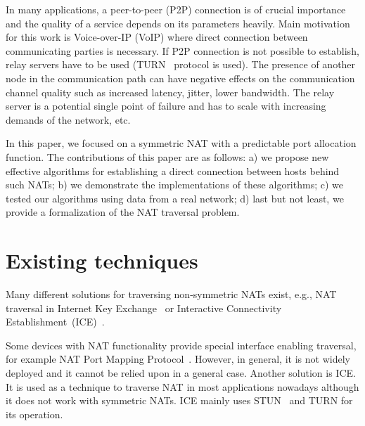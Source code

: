 \documentclass{acm_proc_article-sp}
\newcommand{\ignore}[1]{}
\begin{document}
In many applications, a peer-to-peer (P2P) connection is of crucial importance and the quality of a service depends on 
its parameters heavily. Main motivation for this work is Voice-over-IP (VoIP) where direct connection 
between communicating parties is necessary. If P2P connection is not possible to establish, relay 
servers have to be used (TURN~\citep{rfc5766} protocol is used). The presence 
of another node in the communication path can have negative effects on the communication channel quality 
such as increased latency, jitter, lower bandwidth. The relay server is a potential single point of failure and 
has to scale with increasing demands of the network, etc.

In this paper, we focused on a symmetric NAT with a predictable port allocation function. 
The contributions of this paper are as follows:%
a) we propose new effective algorithms for establishing a direct connection between hosts behind such NATs; %
b) we demonstrate the implementations of these algorithms; %
c) we tested our algorithms using data from a real network; %
d) last but not least, we provide a formalization of the NAT traversal problem.

\section{Existing techniques}
Many different solutions for traversing non-symmetric NATs exist, e.g., NAT traversal in Internet Key Exchange~\citep{rfc3947} or 
Interactive Connectivity Establishment~(ICE)~\citep{rfc5245}. %

Some devices with NAT functionality provide special interface enabling traversal, for example NAT Port Mapping Protocol~\citep{rfc6886}. However, in general, 
it is not widely deployed and it cannot be relied upon in a general case. 
Another solution is ICE\ignore{~\citep{rfc5245}}. It is used as a technique to traverse NAT in most applications nowadays 
although it does not work with symmetric NATs. ICE mainly uses STUN~\citep{rfc5389} and TURN\ignore{~\citep{rfc5766}} for its operation.
\end{document}
